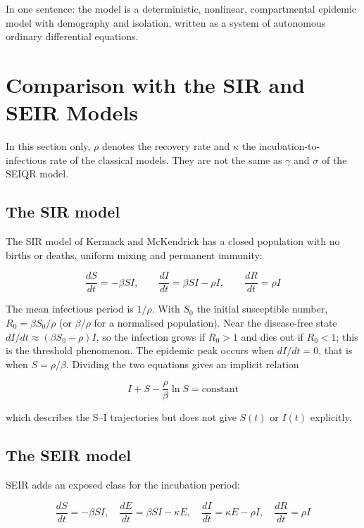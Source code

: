 \documentclass[12pt,a4paper]{article}
\theoremstyle{definition}
\begin{document}
In one sentence: the model is a deterministic, nonlinear, compartmental epidemic model with demography and isolation, written as a system of autonomous ordinary differential equations.


\section{Comparison with the SIR and SEIR Models}

In this section only, $\rho$ denotes the recovery rate and $\kappa$ the incubation-to-infectious rate of the classical models. They are not the same as $\gamma$ and $\sigma$ of the SEIQR model.


\subsection{The SIR model}

The SIR model of Kermack and McKendrick \cite{r1} has a closed population with no births or deaths, uniform mixing and permanent immunity:


\begin{equation}
\frac{dS}{dt} = -\beta SI,\qquad \frac{dI}{dt} = \beta SI - \rho I,\qquad \frac{dR}{dt} = \rho I
\end{equation}

The mean infectious period is $1/\rho$. With $S_{0}$ the initial susceptible number, $R_{0} = \beta S_{0}/\rho$ (or $\beta /\rho$ for a normalised population). Near the disease-free state $dI/dt \approx (\beta S_{0} - \rho )I$, so the infection grows if $R_{0} > 1$ and dies out if $R_{0} < 1$; this is the threshold phenomenon. The epidemic peak occurs when $dI/dt = 0$, that is when $S = \rho /\beta$. Dividing the two equations gives an implicit relation


\begin{equation}
I + S - \frac{\rho}{\beta}\ln S = \text{constant}
\end{equation}

which describes the S–I trajectories but does not give $S(t)$ or $I(t)$ explicitly.


\subsection{The SEIR model}

SEIR adds an exposed class for the incubation period:


\begin{equation}
\frac{dS}{dt}=-\beta SI,\quad \frac{dE}{dt}=\beta SI-\kappa E,\quad \frac{dI}{dt}=\kappa E-\rho I,\quad \frac{dR}{dt}=\rho I
\end{equation}
\end{document}
